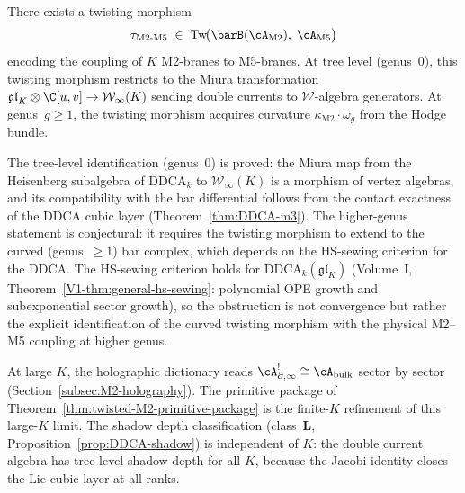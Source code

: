 \begin{conjecture}
\label{conj:M2-M5-coupling}
There exists a twisting morphism
\[
\tau_{\mathrm{M2\text{-}M5}}
\;\in\;
\operatorname{Tw}\!\bigl(
\barB(\cA_{\mathrm{M2}}),\;
\cA_{\mathrm{M5}}
\bigr)
\]
encoding the coupling of $K$ M2-branes to M5-branes.
At tree level \textup{(}genus~$0$\textup{)}, this twisting
morphism restricts to the Miura transformation
$\mathfrak{gl}_K \otimes \C[u,v] \to \mathcal{W}_\infty(K)$
sending double currents to $\mathcal{W}$-algebra generators.
At genus~$g \ge 1$, the twisting morphism acquires curvature
$\kappa_{\mathrm{M2}} \cdot \omega_g$ from the Hodge bundle.
\end{conjecture}

\begin{remark}[M2--M5 coupling]
\label{rem:M2-M5-coupling-scope}
The tree-level identification (genus~$0$) is proved: the Miura
map from the Heisenberg subalgebra of $\mathrm{DDCA}_k$ to
$\mathcal{W}_\infty(K)$ is a morphism of vertex algebras, and
its compatibility with the bar differential follows from
the contact exactness of the DDCA cubic layer
(Theorem~\ref{thm:DDCA-m3}). The higher-genus statement is
conjectural: it requires the twisting morphism to extend to the
curved (genus~$\ge 1$) bar complex, which depends on the
HS-sewing criterion for the DDCA. The HS-sewing criterion
holds for $\mathrm{DDCA}_k(\mathfrak{gl}_K)$
(Volume~I, Theorem~\ref*{V1-thm:general-hs-sewing}: polynomial OPE growth
and subexponential sector growth), so the obstruction is not
convergence but rather the explicit identification of the
curved twisting morphism with the physical M2--M5 coupling at
higher genus.
\end{remark}

\begin{remark}
\label{rem:M2-large-K}
At large $K$, the holographic dictionary reads
$\cA_{\partial,\infty}^! \cong \cA_{\mathrm{bulk}}$
sector by sector (Section~\ref{subsec:M2-holography}).
The primitive package of
Theorem~\ref{thm:twisted-M2-primitive-package} is the
finite-$K$ refinement of this large-$K$ limit. The shadow
depth classification (class~$\mathbf{L}$,
Proposition~\ref{prop:DDCA-shadow}) is independent of $K$:
the double current algebra has tree-level shadow depth for
all $K$, because the Jacobi identity closes the Lie cubic layer
at all ranks.
\end{remark}

%
%

